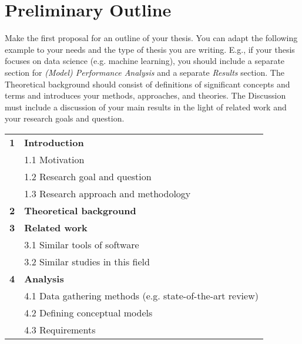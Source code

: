 \section{Preliminary Outline}
\label{sec:outline}
Make the first proposal for an outline of your thesis. You can adapt the following example to your needs and the type of thesis you are writing. E.g., if your thesis focuses on data science (e.g. machine learning), you should include a separate section for \emph{(Model) Performance Analysis} and a separate \emph{Results} section. The Theoretical background should consist of definitions of significant concepts and terms and introduces your methods, approaches, and theories. The Discussion must include a discussion of your main results in the light of related work and your research goals and question.

\begin{table}[h]
\small
\colorbox{usethiscolorhere}{
\centering
\begin{tabularx}{\textwidth}{@{} r Y @{}}
	\textbf{1}
	& \textbf{Introduction}\vspace{2mm}\\
	& 1.1 Motivation \vspace{2mm}\\
    & 1.2 Research goal and question\vspace{2mm}\\
    & 1.3 Research approach and methodology\vspace{2mm}\\
	\textbf{2}
	& \textbf{Theoretical background}\vspace{2mm}\\
	\textbf{3}
	& \textbf{Related work}\vspace{2mm}\\
    & 3.1 Similar tools of software\vspace{2mm}\\
    & 3.2 Similar studies in this field\vspace{2mm}\\
	\textbf{4}
	& \textbf{Analysis}\vspace{2mm}\\
    & 4.1 Data gathering methods (e.g. state-of-the-art review)\vspace{2mm}\\
    & 4.2 Defining conceptual models\vspace{2mm}\\
    & 4.3 Requirements\vspace{2mm}\\

\end{tabularx}}
\end{table}
